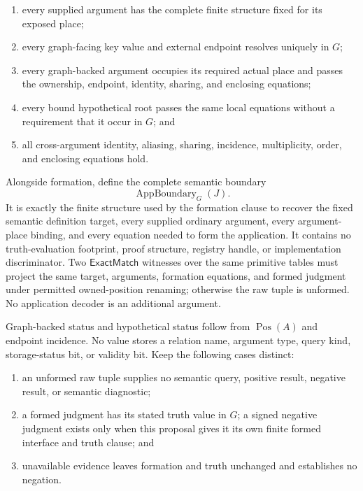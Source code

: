 \documentclass[11pt,twoside]{article}
\newcommand{\ExactMatch}{\mathsf{ExactMatch}}
\begin{document}
\begin{enumerate}[leftmargin=2.2em]
  \item every supplied argument has the complete finite structure fixed for its
        exposed place;
  \item every graph-facing key value and external endpoint resolves uniquely in
        \(G\);
  \item every graph-backed argument occupies its required actual place and passes
        the ownership, endpoint, identity, sharing, and enclosing equations;
  \item every bound hypothetical root passes the same local equations without a
        requirement that it occur in \(G\); and
  \item all cross-argument identity, aliasing, sharing, incidence, multiplicity,
        order, and enclosing equations hold.
\end{enumerate}

Alongside formation, define the complete semantic boundary
\[
  \operatorname{AppBoundary}_G(J).
\]
It is exactly the finite structure used by the formation clause to recover the
fixed semantic definition target, every supplied ordinary argument, every
argument-place binding, and every equation needed to form the application.  It
contains no truth-evaluation footprint, proof structure, registry handle, or
implementation discriminator.  Two \(\ExactMatch\) witnesses over the same
primitive tables must project the same target, arguments, formation equations,
and formed judgment under permitted owned-position renaming; otherwise the raw
tuple is unformed.  No application decoder is an additional argument.

Graph-backed status and hypothetical status follow from
\(\operatorname{Pos}(A)\) and endpoint incidence.  No value stores a relation
name, argument type, query kind, storage-status bit, or validity bit.  Keep the
following cases distinct:

\begin{enumerate}[leftmargin=2.2em]
  \item an unformed raw tuple supplies no semantic query, positive result, negative
        result, or semantic diagnostic;
  \item a formed judgment has its stated truth value in \(G\); a signed negative
        judgment exists only when this proposal gives it its own finite formed
        interface and truth clause; and
  \item unavailable evidence leaves formation and truth unchanged and establishes
        no negation.
\end{enumerate}
\end{document}
